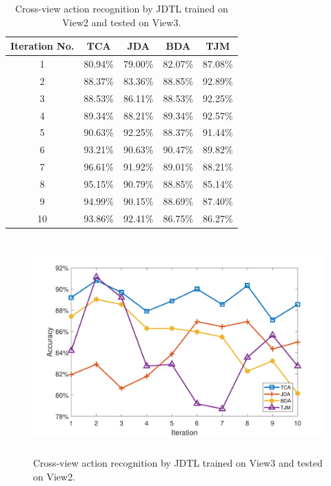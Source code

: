 \begin{table}[]
	\centering
	\caption{Cross-view action recognition by JDTL trained on View2 and tested on View3.} 
	\begin{tabular}{@{\extracolsep{12pt}}ccccc}
		\toprule   
		Iteration No. &  TCA & JDA & BDA & TJM\\ 
		\hline
		\midrule
		1&	80.94\%&	79.00\%&	82.07\%&	87.08\%\\
		2&	88.37\%&	83.36\%&	88.85\%&	92.89\%\\
		3&	88.53\%&	86.11\%&	88.53\%&	92.25\%\\
		4&	89.34\%&	88.21\%&	89.34\%&	92.57\%\\
		5&	90.63\%&	92.25\%&	88.37\%&	91.44\%\\
		6&	93.21\%&	90.63\%&	90.47\%&	89.82\%\\
		7&	96.61\%&	91.92\%&	89.01\%&	88.21\%\\
		8&	95.15\%&	90.79\%&	88.85\%&	85.14\%\\
		9&	94.99\%&	90.15\%&	88.69\%&	87.40\%\\
		10&	93.86\%&	92.41\%&	86.75\%&	86.27\%\\
		\bottomrule
		\hline
		\midrule
	\end{tabular}%
	\label{table7}
\end{table}

\begin{figure}[]
	\centering
	\includegraphics[width=5in,height=3.25in]{figures/plots/View3-View2}
	\linebreak
	\caption{Cross-view action recognition by JDTL trained on View3 and tested on View2.}
	\label{fig1:View3-View2}
\end{figure}


